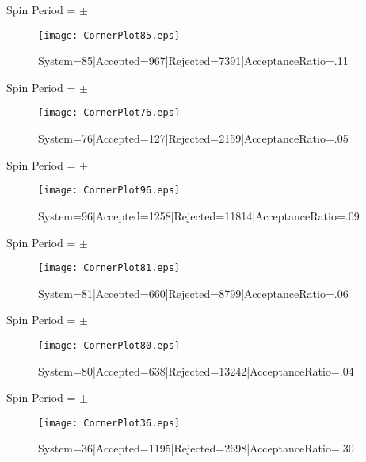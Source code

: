 \documentclass[10pt]{article}
\begin{document}
\listoffigures
\begin{center}
        Spin Period = $\pm$ 
\begin{figure}[h] 
        \texttt{[image: CornerPlot85.eps]}
        \caption{System=85|Accepted=967|Rejected=7391|AcceptanceRatio=.11}
        \label{S85}
        \centering
        \end{figure}
        \end{center}
\begin{center}
        Spin Period = $\pm$ 
\begin{figure}[h] 
        \texttt{[image: CornerPlot76.eps]}
        \caption{System=76|Accepted=127|Rejected=2159|AcceptanceRatio=.05}
        \label{S76}
        \centering
        \end{figure}
        \end{center}
\begin{center}
        Spin Period = $\pm$ 
\begin{figure}[h] 
        \texttt{[image: CornerPlot96.eps]}
        \caption{System=96|Accepted=1258|Rejected=11814|AcceptanceRatio=.09}
        \label{S96}
        \centering
        \end{figure}
        \end{center}
\begin{center}
        Spin Period = $\pm$ 
\begin{figure}[h] 
        \texttt{[image: CornerPlot81.eps]}
        \caption{System=81|Accepted=660|Rejected=8799|AcceptanceRatio=.06}
        \label{S81}
        \centering
        \end{figure}
        \end{center}
\begin{center}
        Spin Period = $\pm$ 
\begin{figure}[h] 
        \texttt{[image: CornerPlot80.eps]}
        \caption{System=80|Accepted=638|Rejected=13242|AcceptanceRatio=.04}
        \label{S80}
        \centering
        \end{figure}
        \end{center}
\begin{center}
        Spin Period = $\pm$ 
\begin{figure}[h] 
        \texttt{[image: CornerPlot36.eps]}
        \caption{System=36|Accepted=1195|Rejected=2698|AcceptanceRatio=.30}
        \label{S36}
        \centering
        \end{figure}
        \end{center}
\end{document}
